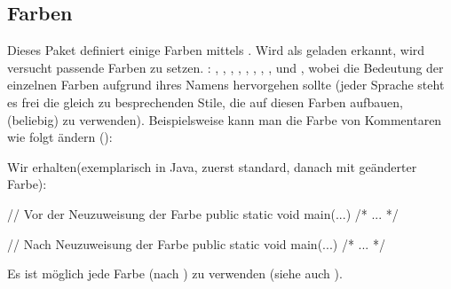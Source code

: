 \documentclass{sopra-base}
\begin{document}
\subsection{Farben}

    Dieses Paket definiert einige Farben mittels . Wird  als geladen erkannt, wird versucht passende Farben zu setzen. : , , , , , , , ,  und , wobei die Bedeutung der einzelnen Farben aufgrund ihres Namens hervorgehen sollte (jeder Sprache steht es frei die gleich zu besprechenden Stile, die
    auf diesen Farben aufbauen, (beliebig) zu verwenden). Beispielsweise kann man die Farbe
    von Kommentaren wie folgt ändern ():
\begin{plainlatex}[morekeywords={[2]{\\lstcolorlet}}]
\end{plainlatex}
    Wir erhalten(exemplarisch in Java, zuerst standard, danach mit geänderter Farbe):
    \bgroup
\begin{java}
// Vor der Neuzuweisung der Farbe
public static void main(...){ /* ... */ }
\end{java}
\begin{java}
// Nach Neuzuweisung der Farbe
public static void main(...){ /* ... */ }
    \end{java}
    \egroup
 Es ist möglich jede Farbe (nach ) zu verwenden (siehe auch ).
\end{document}
